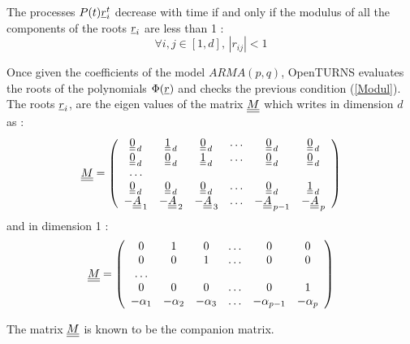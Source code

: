 The processes  $P(t){\underline{r}}_i^t$ decrease with time if and only if the modulus of all the components of the roots ${\underline{r}}_i$ are less than 1 :
\begin{equation}\label{Modul}
  \forall i,j \in [1,d], \,  |r_{ij}| <1
\end{equation}

Once given the coefficients of the model $ARMA(p,q)$, OpenTURNS evaluates  the roots of the polynomials $\Phi({\underline{r}})$  and checks the previous  condition (\ref{Modul}). The roots ${\underline{r}}_i$, are the eigen values of the matrix ${\underline{\underline{M}}}$ which writes in dimension $d$ as :
\begin{equation}\label{MatrixMdimn}
  {\underline{\underline{M}}} = \left(
  \begin{array}{cccccc}
    {\underline{\underline{0}}}_{\, d} & {\underline{\underline{1}}}_{\, d} & {\underline{\underline{0}}}_{\, d} & \hdots & {\underline{\underline{0}}}_{\, d} & {\underline{\underline{0}}}_{\, d} \\
    {\underline{\underline{0}}}_{\, d} & {\underline{\underline{0}}}_{\, d} & {\underline{\underline{1}}}_{\, d} & \hdots & {\underline{\underline{0}}}_{\, d} & {\underline{\underline{0}}}_{\, d}\\
    \hdots \\
    {\underline{\underline{0}}}_{\, d} & {\underline{\underline{0}}}_{\, d} & {\underline{\underline{0}}}_{\, d} & \hdots & {\underline{\underline{0}}}_{\, d} & {\underline{\underline{1}}}_{\, d}\\
    - {\underline{\underline{A}}}_{\, 1} & -{\underline{\underline{A}}}_{\, 2} & - {\underline{\underline{A}}}_{\, 3}& \hdots  & -{\underline{\underline{A}}}_{\, p-1}& -{\underline{\underline{A}}}_{\, p}
  \end{array}
  \right )
\end{equation}
and  in dimension 1 :
\begin{equation}\label{MatrixMdim1}
  {\underline{\underline{M}}} = \left(
  \begin{array}{cccccc}
    0 & 1 & 0 & \hdots & 0 & 0\\
    0 & 0 & 1 & \hdots & 0 & 0\\
    \hdots \\
    0 & 0 & 0 & \hdots & 0 & 1\\
    -\alpha_1 & -\alpha_2 & -\alpha_3 & \hdots  & -\alpha_{p-1} & -\alpha_p
  \end{array}
  \right )
\end{equation}

The matrix ${\underline{\underline{M}}}$ is known to be the companion matrix.

